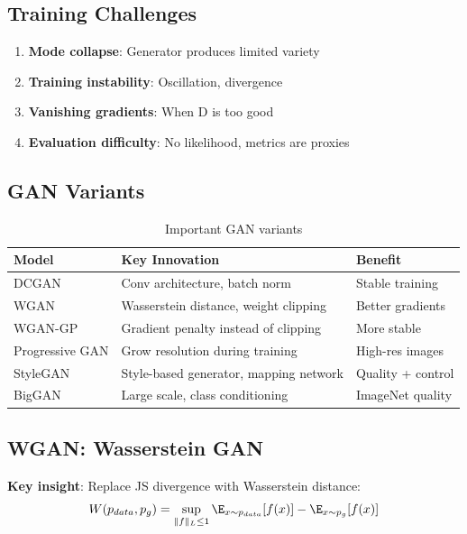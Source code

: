 \subsection{Training Challenges}

\begin{enumerate}
    \item \textbf{Mode collapse}: Generator produces limited variety
    \item \textbf{Training instability}: Oscillation, divergence
    \item \textbf{Vanishing gradients}: When D is too good
    \item \textbf{Evaluation difficulty}: No likelihood, metrics are proxies
\end{enumerate}

\subsection{GAN Variants}

\begin{table}[H]
\centering
\caption{Important GAN variants}
\begin{tabularx}{\textwidth}{lXX}
\toprule
\textbf{Model} & \textbf{Key Innovation} & \textbf{Benefit} \\
\midrule
DCGAN & Conv architecture, batch norm & Stable training \\
WGAN & Wasserstein distance, weight clipping & Better gradients \\
WGAN-GP & Gradient penalty instead of clipping & More stable \\
Progressive GAN & Grow resolution during training & High-res images \\
StyleGAN & Style-based generator, mapping network & Quality + control \\
BigGAN & Large scale, class conditioning & ImageNet quality \\
\bottomrule
\end{tabularx}
\end{table}

\subsection{WGAN: Wasserstein GAN}

\textbf{Key insight}: Replace JS divergence with Wasserstein distance:
\begin{equation}
W(p_{data}, p_g) = \sup_{\|f\|_L \leq 1} \E_{x \sim p_{data}}[f(x)] - \E_{x \sim p_g}[f(x)]
\end{equation}

